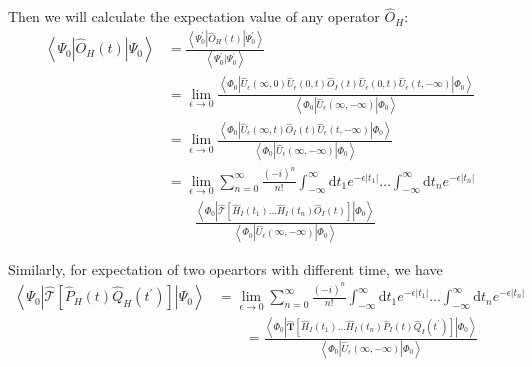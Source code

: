 \documentclass[bachelor, english]{ustcthesis}
\begin{document}
Then we will calculate the expectation value of any operator $\hat{O}_H$:
$$
\begin{aligned}
	\left\langle\Psi_{0}\left|\hat{O}_{H}(t)\right| \Psi_{0}\right\rangle 
	&=\frac{\left\langle\Psi_{0}^{\prime}\left|\hat{O}_{H}(t)\right| \Psi_{0}^{\prime}\right\rangle}
	{\left\langle\Psi_{0}^{\prime} | \Psi_{0}^{\prime}\right\rangle}
	\\
	&=\lim _{\epsilon \rightarrow 0} 
	\frac{\left\langle\Phi_{0}\left|\hat{U}_{\epsilon}(\infty, 0)\hat{U}_{\epsilon}(0, t) \hat{O}_{I}(t) \hat{U}_{\epsilon}(0, t)\hat{U}_{\epsilon}(t,-\infty)\right| \Phi_{0}\right\rangle}
	{\left\langle\Phi_{0}\left|\hat{U}_{\epsilon}(\infty,-\infty)\right| \Phi_{0}\right\rangle}
	\\
	&=\lim _{\epsilon \rightarrow 0} 
	\frac{\left\langle\Phi_{0}\left|\hat{U}_{\epsilon}(\infty, t) \hat{O}_{I}(t) \hat{U}_{\epsilon}(t,-\infty)\right| \Phi_{0}\right\rangle}
	{\left\langle\Phi_{0}\left|\hat{U}_{\epsilon}(\infty,-\infty)\right| \Phi_{0}\right\rangle}
	\\
	&=\lim _{\epsilon \rightarrow 0} \sum_{n=0}^{\infty} \frac{(-i)^{n}}{n !} \int_{-\infty}^{\infty} \mathrm{d} t_{1} e^{-\epsilon\left|t_{1}\right|} \ldots \int_{-\infty}^{\infty} \mathrm{d} t_{n} e^{-\epsilon\left|t_{n}\right|}
	\\
	&\qquad \frac{\left\langle\Phi_{0}\left|
	\hat{\mathcal{T}}\left[\hat{H}_{I}\left(t_{1}\right) \ldots \hat{H}_{I}\left(t_{n}\right) \hat{O}_{I}(t)\right]\right|
	\Phi_{0}\right\rangle}
	{\left\langle\Phi_{0}\left|\hat{U}_{\epsilon}(\infty,-\infty)\right| \Phi_{0}\right\rangle}
\end{aligned}
$$

Similarly, for expectation of two opeartors with different time, we have
$$
\begin{aligned}
	\left\langle\Psi_{0}\left|\hat{\mathcal{T}}\left[\hat{P}_{H}(t) \hat{Q}_{H}\left(t^{\prime}\right)\right]\right| \Psi_{0}\right\rangle
	&=\lim _{\epsilon \rightarrow 0} \sum_{n=0}^{\infty} \frac{(-i)^{n}}{n !} \int_{-\infty}^{\infty} \mathrm{d} t_{1} e^{-\epsilon\left|t_{1}\right|} \ldots \int_{-\infty}^{\infty} \mathrm{d} t_{n} e^{-\epsilon\left|t_{n}\right|}
	\\
	&\qquad =\frac{\left\langle\Phi_{0}\left|
	\hat{\boldsymbol{T}}\left[\hat{H}_{I}\left(t_{1}\right) \ldots \hat{H}_{I}\left(t_{n}\right) \hat{P}_{I}(t) \hat{Q}_{I}\left(t^{\prime}\right)\right]\right|
	\Phi_{0}\right\rangle}
	{\left\langle\Phi_{0}\left|\hat{U}_{\epsilon}(\infty,-\infty)\right| \Phi_{0}\right\rangle}
\end{aligned}
$$
\end{document}
